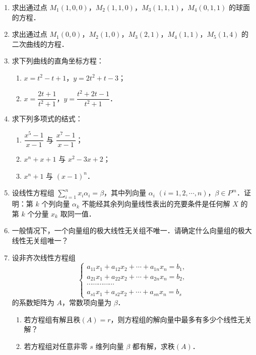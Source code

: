 \begin{enumerate}
\begin{enumerate}
  \anssub
    \item 如果 $a_{ii}>\sum\limits_{j\ne i}|a_{ij}|$，$i=1,2,\cdots,n$，那么 $|A|>0$．
  \anssub
  \end{enumerate}
  \item 求出通过点 $M_1(1,0,0)$，$M_2(1,1,0)$，$M_3(1,1,1)$，$M_4(0,1,1)$ 的球面的方程．
  \anscompute
  \item 求出通过点 $M_1(0,0)$，$M_2(1,0)$，$M_3(2,1)$，$M_4(1,1)$，$M_5(1,4)$ 的二次曲线的方程．
  \anscompute
  \item 求下列曲线的直角坐标方程：
  \begin{enumerate}
    \item $x=t^2-t+1$，$y=2t^2+t-3$；
  \anssub
    \item $x=\dfrac{2t+1}{t^2+1}$，$y=\dfrac{t^2+2t-1}{t^2+1}$．
  \anssub
  \end{enumerate}
  \item 求下列多项式的结式：
  \begin{enumerate}
    \item $\dfrac{x^5-1}{x-1}$ 与 $\dfrac{x^7-1}{x-1}$；
  \anssub
    \item $x^n+x+1$ 与 $x^2-3x+2$；
  \anssub
    \item $x^n+1$ 与 $(x-1)^n$．
  \anssub
  \end{enumerate}
  \item 设线性方程组 $\sum\limits_{i=1}^{n}x_i\alpha_i=\beta$，其中列向量 $\alpha_i$ $(i=1,2,\cdots,n)$，$\beta\in P^m$．证明：第 $k$ 个列向量 $\alpha_k$ 不能经其余列向量线性表出的充要条件是任何解 $X$ 的第 $k$ 个分量 $x_k$ 取同一值．
  \ansproof
  \item 一般情况下，一个向量组的极大线性无关组不唯一．请确定什么向量组的极大线性无关组唯一？
  \ansgeneral
  \item 设非齐次线性方程组
  \[
    \begin{cases}
      a_{11}x_1+a_{12}x_2+\cdots+a_{1n}x_n=b_1,\\
      a_{21}x_1+a_{22}x_2+\cdots+a_{2n}x_n=b_2,\\
      \cdots\cdots\cdots\cdots\cdots\\
      a_{s1}x_1+a_{s2}x_2+\cdots+a_{sn}x_n=b_s %
    \end{cases}
  \]
  的系数矩阵为 $A$，常数项向量为 $\beta$．
  \begin{enumerate}
    \item 若方程组有解且秩$(A)=r$，则方程组的解向量中最多有多少个线性无关解？
  \anssub
    \item 若方程组对任意非零 $s$ 维列向量 $\beta$ 都有解，求秩$(A)$．

\end{enumerate}
\end{enumerate}
